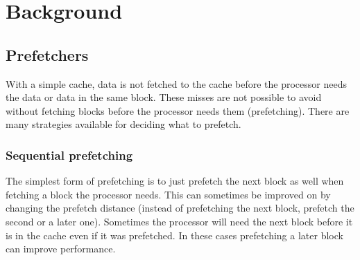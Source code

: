 \section{Background}
\label{sec:background}
\subsection{Prefetchers}


With a simple cache, data is not fetched to the cache before the
processor needs the data or data in the same block. These misses
are not possible to avoid without fetching blocks before the
processor needs them (prefetching). There are many strategies
available for deciding what to prefetch.

\subsubsection{Sequential prefetching}

The simplest form of prefetching is to just prefetch the next block
as well when fetching a block the processor needs. This can
sometimes be improved on by changing the prefetch distance (instead
of prefetching the next block, prefetch the second or a later one).
Sometimes the processor will need the next block before it is in
the cache even if it was prefetched. In these cases prefetching a
later block can improve performance.

